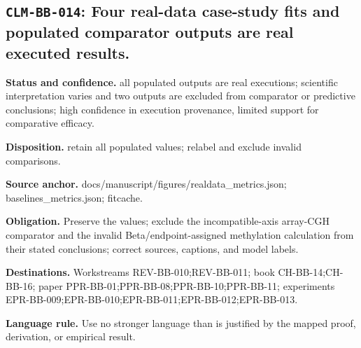 \subsection[\texttt{CLM-BB-014}]{\texttt{CLM-BB-014}: Four real-data case-study fits and populated comparator outputs are real executed results.}
\textbf{Status and confidence.} all populated outputs are real executions; scientific interpretation varies and two outputs are excluded from comparator or predictive conclusions; high confidence in execution provenance, limited support for comparative efficacy.\par
\textbf{Disposition.} retain all populated values; relabel and exclude invalid comparisons.\par
\textbf{Source anchor.} docs/manuscript/figures/realdata\_metrics.json; baselines\_metrics.json; fitcache.\par
\textbf{Obligation.} Preserve the values; exclude the incompatible-axis array-CGH comparator and the invalid Beta/endpoint-assigned methylation calculation from their stated conclusions; correct sources, captions, and model labels.\par
\textbf{Destinations.} Workstreams REV-BB-010;REV-BB-011; book CH-BB-14;CH-BB-16; paper PPR-BB-01;PPR-BB-08;PPR-BB-10;PPR-BB-11; experiments EPR-BB-009;EPR-BB-010;EPR-BB-011;EPR-BB-012;EPR-BB-013.\par
\textbf{Language rule.} Use no stronger language than is justified by the mapped proof, derivation, or empirical result.


